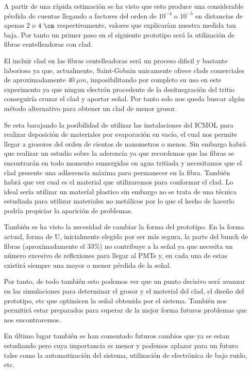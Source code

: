 A partir de una rápida estimación se ha visto que esto produce una considerable pérdida de cuentas llegando a factores del orden de $10^{-4}$ o $10^{-5}$ en distancias de apenas $2$ o $4~\cm$ respectivamente, valores que explicarían nuestra medida tan baja. Por tanto un primer paso en el siguiente prototipo será la utilización de fibras centelleadoras con clad. 

El incluir clad en las fibras centelleadoras será un proceso dificil y bastante laborioso ya que, actualmente, Saint-Gobain unicamente ofrece clads comerciales de aproximadamente $40~\mu m$, imposibilitando por completo su uso en este experimento ya que ningun electrón procedente de la desitnegración del tritio conseguiría cruzar el clad y aportar señal. Por tanto solo nos queda buscar algún método alternativo para obtener un clad de menor grosor. 

Se esta barajando la posibilidad de utilizar las instalaciones del ICMOL para realizar deposición de materiales por evaporación en vacío, el cual nos permite llegar a grosores del orden de cientos de nanometros o menos. Sin embargo habrá que realizar un estudio sobre la aderencia ya que recordemos que las fibras se encontrarán en todo momento sumergidas en agua tritiada y necesitamos que el clad presente una adherencia máxima para permanecer en la fibra. También habrá que ver cual es el material que utilizaremos para conformar el clad. Lo ideal sería utilizar un materíal plastico sin embargo no se trata de una técnica estudiada para utilizar materiales no metálicos por lo que el hecho de hacerlo podría propiciar la aparición de problemas.

También es ha visto la necesidad de cambiar la forma del prototipo. En la forma actual, forma de U, inicialmente elegida por ser más segura,  la parte del bunch de fibras (aproximadamente el $33\%$) no contribuye a la señal ya que necesita un número excesivo de reflexiones para llegar al PMTs y, en cada una de estas existirá siempre una mayor o menor pérdida de la señal.

Por tanto, de todo también esto podemos ver que un punto decisivo será avanzar en las simulaciones para determinar el grosor y el material del clad, el diseño del prototipo, etc que optimicen la señal obtenida por el sistema. También nos permitirá estar preparados para superar de la mejor forma futuros problemas que nos encontraremos.

En último lugar también se han comentado futuros cambios que ya se estan estudiando pero cuya importancia es menor y podemos aplazar para un futuro tales como la automatización del sistema, utilización de electrónica de bajo ruido, etc.